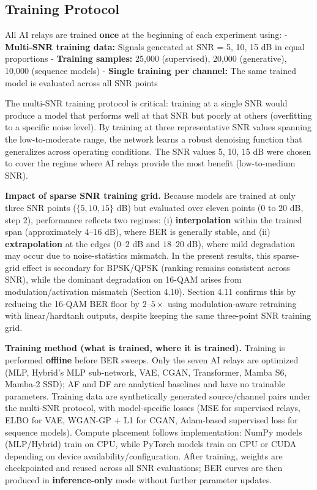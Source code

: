 \documentclass[
  english,
  12pt,
  12pt,
  a4paper,
  oneside]{report}
\begin{document}
\subsection{Training Protocol}\label{sec:training-protocol}

All AI relays are trained \textbf{once} at the beginning of each experiment using: - \textbf{Multi-SNR training data:} Signals generated at SNR = 5, 10, 15 dB in equal proportions - \textbf{Training samples:} 25,000 (supervised), 20,000 (generative), 10,000 (sequence models) - \textbf{Single training per channel:} The same trained model is evaluated across all SNR points

The multi-SNR training protocol is critical: training at a single SNR would produce a model that performs well at that SNR but poorly at others (overfitting to a specific noise level). By training at three representative SNR values spanning the low-to-moderate range, the network learns a robust denoising function that generalizes across operating conditions. The SNR values 5, 10, 15 dB were chosen to cover the regime where AI relays provide the most benefit (low-to-medium SNR).

\textbf{Impact of sparse SNR training grid.} Because models are trained at only three SNR points (\(\{5,10,15\}\) dB) but evaluated over eleven points (\(0\) to \(20\) dB, step \(2\)), performance reflects two regimes: (i) \textbf{interpolation} within the trained span (approximately \(4\)--\(16\) dB), where BER is generally stable, and (ii) \textbf{extrapolation} at the edges (\(0\)--\(2\) dB and \(18\)--\(20\) dB), where mild degradation may occur due to noise-statistics mismatch. In the present results, this sparse-grid effect is secondary for BPSK/QPSK (ranking remains consistent across SNR), while the dominant degradation on 16-QAM arises from modulation/activation mismatch (Section 4.10). Section 4.11 confirms this by reducing the 16-QAM BER floor by \(2\)--\(5\times\) using modulation-aware retraining with linear/hardtanh outputs, despite keeping the same three-point SNR training grid.

\textbf{Training method (what is trained, where it is trained).} Training is performed \textbf{offline} before BER sweeps. Only the seven AI relays are optimized (MLP, Hybrid's MLP sub-network, VAE, CGAN, Transformer, Mamba S6, Mamba-2 SSD); AF and DF are analytical baselines and have no trainable parameters. Training data are synthetically generated source/channel pairs under the multi-SNR protocol, with model-specific losses (MSE for supervised relays, ELBO for VAE, WGAN-GP + L1 for CGAN, Adam-based supervised loss for sequence models). Compute placement follows implementation: NumPy models (MLP/Hybrid) train on CPU, while PyTorch models train on CPU or CUDA depending on device availability/configuration. After training, weights are checkpointed and reused across all SNR evaluations; BER curves are then produced in \textbf{inference-only} mode without further parameter updates.
\end{document}
